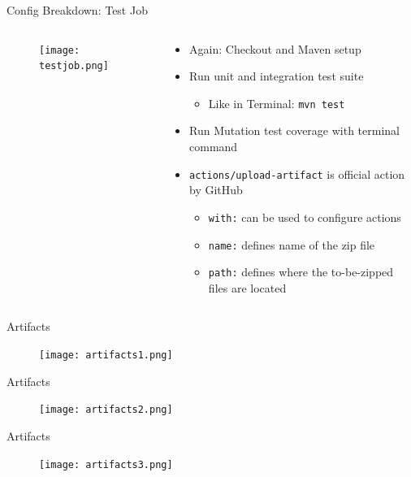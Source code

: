 \documentclass[compress,aspectratio=169]{beamer}
\begin{document}
	\begin{frame}{Config Breakdown: Test Job}
    \begin{columns}
      \begin{column}{0.5\textwidth}
        \begin{figure}
          \begin{center}
            \texttt{[image: testjob.png]}
          \end{center}
        \end{figure}
      \end{column}
      \begin{column}{0.5\textwidth}
        \begin{itemize}
          \item Again: Checkout and Maven setup
          \item Run unit and integration test suite
            \begin{itemize}
              \item Like in Terminal: \texttt{mvn test}
            \end{itemize}
          \item Run Mutation test coverage with terminal command
          \item \texttt{actions/upload-artifact} is official action by GitHub
            \begin{itemize}
              \item \texttt{with:} can be used to configure actions
              \item \texttt{name:} defines name of the zip file
              \item \texttt{path:} defines where the to-be-zipped files are located
            \end{itemize}
        \end{itemize}
      \end{column}
    \end{columns}
	\end{frame}

	\begin{frame}{Artifacts}
    \begin{figure}
      \begin{center}
        \texttt{[image: artifacts1.png]}
      \end{center}
    \end{figure}
	\end{frame}
	\begin{frame}{Artifacts}
    \begin{figure}
      \begin{center}
        \texttt{[image: artifacts2.png]}
      \end{center}
    \end{figure}
	\end{frame}
	\begin{frame}{Artifacts}
    \begin{figure}
      \begin{center}
        \texttt{[image: artifacts3.png]}
      \end{center}
    \end{figure}
	\end{frame}
\end{document}
